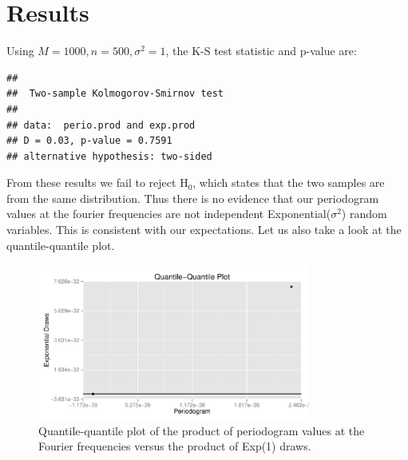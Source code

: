 \documentclass{article}\usepackage[]{graphicx}\usepackage[]{color}
\makeatletter
\newenvironment{kframe}{%
 \def\at@end@of@kframe{}%
 \ifinner\ifhmode%
  \def\at@end@of@kframe{\end{minipage}}%
  \begin{minipage}{\columnwidth}%
 \fi\fi%
 \def\FrameCommand##1{\hskip\@totalleftmargin \hskip-\fboxsep
 \colorbox{shadecolor}{##1}\hskip-\fboxsep
     \hskip-\linewidth \hskip-\@totalleftmargin \hskip\columnwidth}%
 \MakeFramed {\advance\hsize-\width
   \@totalleftmargin\z@ \linewidth\hsize
   \@setminipage}}%
 {\par\unskip\endMakeFramed%
 \at@end@of@kframe}
\newenvironment{knitrout}{}{} %
\theoremstyle{plain}
\makeatother
\begin{document}
\section*{Results}
Using $M = 1000, n = 500, \sigma^2 = 1$, the K-S test statistic and p-value are:
\begin{knitrout}
\color{fgcolor}\begin{kframe}
\begin{verbatim}
## 
## 	Two-sample Kolmogorov-Smirnov test
## 
## data:  perio.prod and exp.prod
## D = 0.03, p-value = 0.7591
## alternative hypothesis: two-sided
\end{verbatim}
\end{kframe}
\end{knitrout}

From these results we fail to reject $\text{H}_0$, which states that the two samples are from the same distribution. Thus there is no evidence that our periodogram values at the fourier frequencies are not independent Exponential($\sigma^2$) random variables. This is consistent with our expectations. Let us also take a look at the quantile-quantile plot.
\begin{knitrout}
\color{fgcolor}\begin{figure}[H]


{\centering \includegraphics[width=0.8\textwidth]{figure/qqplot} 

}

\caption[Quantile-quantile plot of the product of periodogram values at the Fourier frequencies versus the product of Exp(1) draws]{Quantile-quantile plot of the product of periodogram values at the Fourier frequencies versus the product of Exp(1) draws.\label{fig:qqplot}}
\end{figure}


\end{knitrout}
\end{document}
